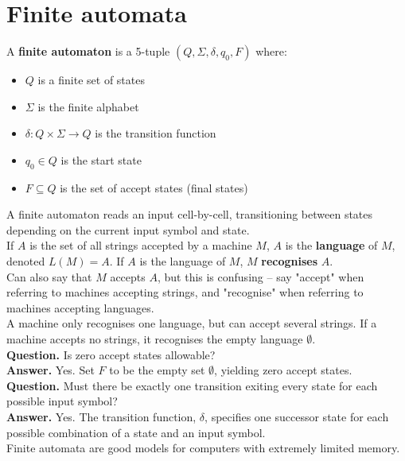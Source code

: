 \documentclass{article}
\begin{document}
\section{Finite automata}
A \textbf{finite automaton} is a 5-tuple $(Q, \Sigma, \delta, q_0, F)$ where:
\begin{itemize}
	\item $Q$ is a finite set of states
	\item $\Sigma$ is the finite alphabet
	\item $\delta: Q\times\Sigma \rightarrow Q$ is the transition function
	\item $q_0 \in Q$ is the start state
	\item $F \subseteq Q$ is the set of accept states (final states)
\end{itemize}
A finite automaton reads an input cell-by-cell, transitioning between states depending on the current input symbol and state.\medskip
\\ If $A$ is the set of all strings accepted by a machine $M$, $A$ is the \textbf{language} of $M$, denoted $L(M) = A$. If $A$ is the language of $M$, $M$ \textbf{recognises} $A$.\medskip
\\Can also say that $M$ accepts $A$, but this is confusing -- say "accept" when referring to machines accepting strings, and "recognise" when referring to machines accepting languages.\medskip
\\ A machine only recognises one language, but can accept several strings. If a machine accepts no strings, it recognises the empty language $\emptyset$.\medskip
\\\textbf{Question.} Is zero accept states allowable?
\\\textbf{Answer.} Yes. Set $F$ to be the empty set $\emptyset$, yielding zero accept states.\medskip
\\\textbf{Question.} Must there be exactly one transition exiting every state for each possible input symbol?
\\\textbf{Answer.} Yes. The transition function, $\delta$, specifies one successor state for each possible combination of a state and an input symbol.\medskip
\\Finite automata are good models for computers with extremely limited memory.
\end{document}
